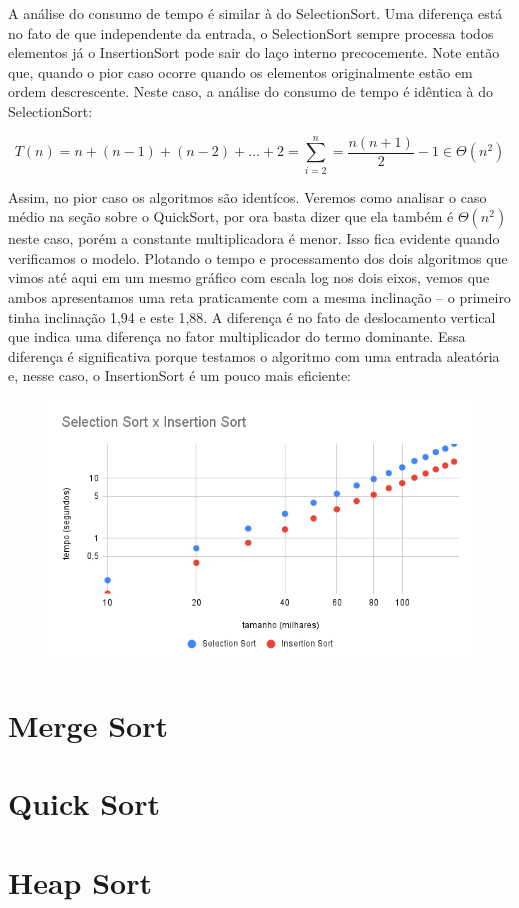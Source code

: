    A análise do consumo de tempo é similar à do SelectionSort.
   Uma diferença está no fato de que independente da entrada, o SelectionSort sempre processa todos elementos já o InsertionSort pode sair do laço interno precocemente.
   Note então que, quando o pior caso ocorre quando os elementos originalmente estão em ordem descrescente.
   Neste caso, a análise do consumo de tempo é idêntica à do SelectionSort:

   \begin{displaymath}
     T(n) = n + (n-1) + (n-2) + \dots + 2 = \sum_{i=2}^n = \frac{n(n+1)}{2} - 1 \in \Theta(n^2)
   \end{displaymath}

   Assim, no pior caso os algoritmos são identícos.
   Veremos como analisar o caso médio na seção sobre o QuickSort, por ora basta dizer que ela também é $\Theta(n^2)$ neste caso, porém a constante multiplicadora é menor.
   Isso fica evidente quando verificamos o modelo.
   Plotando o tempo e processamento dos dois algoritmos que vimos até aqui em um mesmo gráfico com escala log nos dois eixos, vemos que ambos apresentamos uma reta praticamente com a mesma inclinação -- o primeiro tinha inclinação 1,94 e este 1,88.
   A diferença é no fato de deslocamento vertical que indica uma diferença no fator multiplicador do termo dominante.
   Essa diferença é significativa porque testamos o algoritmo com uma entrada aleatória e, nesse caso, o InsertionSort é um pouco mais eficiente:

   
  \begin{figure}
    \includegraphics[width=\textwidth]{imagens/SelectionInsertion.png}
  \end{figure}   
  
\section{Merge Sort}
\section{Quick Sort}
\section{Heap Sort}
